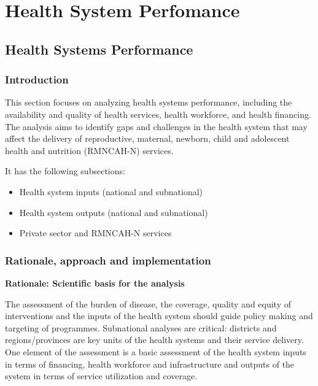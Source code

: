 \documentclass[
  english,
  letterpaper,
  DIV=11,
  numbers=noendperiod]{scrreprt}
\begin{document}
\part{Health System Perfomance}

\chapter{Health Systems Performance}\label{health-systems-performance}

\section{Introduction}\label{introduction}

This section focuses on analyzing health systems performance, including
the availability and quality of health services, health workforce, and
health financing. The analysis aims to identify gaps and challenges in
the health system that may affect the delivery of reproductive,
maternal, newborn, child and adolescent health and nutrition (RMNCAH-N)
services.

It has the following subsections:

\begin{itemize}
\item
  Health system inputs (national and subnational)
\item
  Health system outputs (national and subnational)
\item
  Private sector and RMNCAH-N services
\end{itemize}

\section{Rationale, approach and
implementation}\label{rationale-approach-and-implementation-8}

\textbf{Rationale: Scientific basis for the analysis}

The assessment of the burden of disease, the coverage, quality and
equity of interventions and the inputs of the health system should guide
policy making and targeting of programmes. Subnational analyses are
critical: districts and regions/provinces are key units of the health
systems and their service delivery. One element of the assessment is a
basic assessment of the health system inputs in terms of financing,
health workforce and infrastructure and outputs of the system in terms
of service utilization and coverage.
\end{document}
